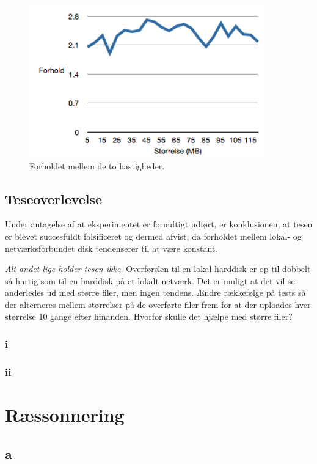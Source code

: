 \documentclass{article}
\begin{document}
\begin{figure}
	\includegraphics[width=4in]{plotforhold.png}
	\caption{Forholdet mellem de to hastigheder.}
	\label{plotforhold}
\end{figure}

\subsection{Teseoverlevelse}
Under antagelse af at eksperimentet er fornuftigt udført, er konklusionen, at tesen er blevet succesfuldt falsificeret og dermed afvist, da forholdet mellem lokal- og netværksforbundet disk tendenserer til at være konstant.

\textit{Alt andet lige holder tesen ikke.}
Overførslen til en lokal harddisk er op til dobbelt så hurtig som til en harddisk på et lokalt netværk.
Det er muligt at det vil se anderledes ud med større filer, men ingen tendens.
Ændre rækkefølge på tests så der alterneres mellem størrelser på de overførte filer frem for at der uploades hver størrelse 10 gange efter hinanden.
Hvorfor skulle det hjælpe med større filer?

\subsubsection{i}

\subsubsection{ii}

\section{Ræssonnering}

\subsection{a}
\end{document}
